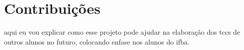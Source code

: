 \section{Contribuições}


aqui eu vou explicar como esse projeto pode ajudar na elaboração dos tccs de outros alunos no futuro, colocando enfase nos alunos do ifba.
